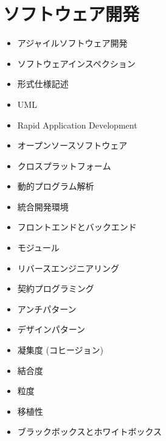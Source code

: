 \documentclass[a4j, titlepage, 11pt]{jsarticle}
\begin{document}
\section{ソフトウェア開発}
\begin{multicols}{2}
\begin{itemize}
	\item アジャイルソフトウェア開発
	\item ソフトウェアインスペクション
	\item 形式仕様記述
	\item UML
	\item Rapid Application Development
	\item オープンソースソフトウェア
	\item クロスプラットフォーム
	\item 動的プログラム解析
	\item 統合開発環境
	\item フロントエンドとバックエンド
	\item モジュール
	\item リバースエンジニアリング
	\item 契約プログラミング
	\item アンチパターン
	\item デザインパターン
	\item 凝集度 (コヒージョン)
	\item 結合度
	\item 粒度
	\item 移植性
	\item ブラックボックスとホワイトボックス
\end{itemize}
\end{multicols}
\end{document}
